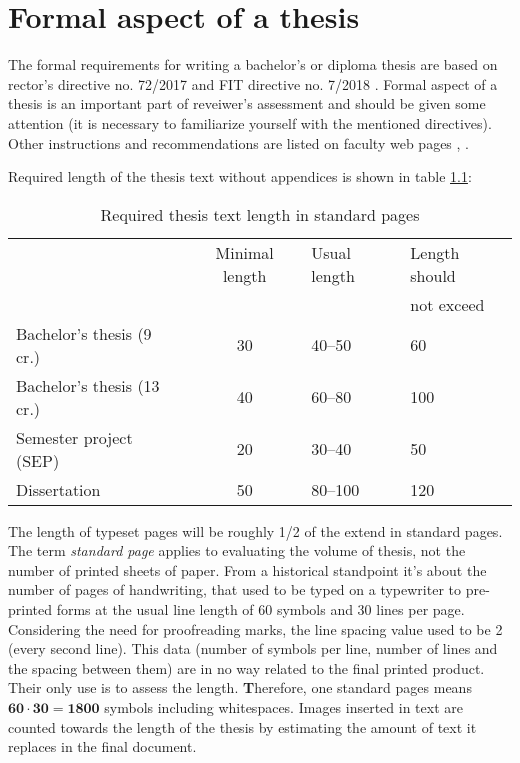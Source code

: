 {{\chapter{Formal aspect of a thesis}
\label{formality}

The formal requirements for writing a bachelor's or diploma thesis are based on rector's directive no. 72/2017 \cite{smernice} and FIT directive no. 7/2018 \cite{smerniceFIT}. Formal aspect of a thesis is an important part of reveiwer's  assessment and should be given some attention (it is necessary to familiarize yourself with the mentioned directives). Other instructions and recommendations are listed on faculty web pages \cite{formalniBP}, \cite{formalniDP}.

Required length of the thesis text without appendices is shown in table \ref{rozsah}:

\begin{table}[hbt]
\centering
\caption{Required thesis text length in standard pages}
\label{rozsah}
\begin{tabular}{|l|c|l|l|}
\hline
 & Minimal length & Usual length & Length should \\
 &  &  & not exceed  \\ \hline
Bachelor's thesis (9 cr.) & 30 & 40--50 & 60 \\ \hline
Bachelor's thesis (13 cr.) & 40 & 60--80 & 100 \\ \hline
Semester project (SEP) & 20 & 30--40 & 50 \\ \hline
Dissertation & 50 & 80--100 & 120 \\ \hline
\end{tabular}
\end{table}

The length of typeset pages will be roughly 1/2 of the extend in standard pages. The term {\it standard page} applies to evaluating the volume of thesis, not the number of printed sheets of paper. From a historical standpoint it's about the number of pages of handwriting, that used to be typed on a typewriter to pre-printed forms at the usual line length of 60 symbols and 30 lines per page. Considering the need for proofreading marks, the line spacing value used to be 2 (every second line). This data (number of symbols per line, number of lines and the spacing between them) are in no way related to the final printed product. Their only use is to assess the length. \textbf Therefore, one standard pages means $\mathbf{60\cdot 30 = 1800}$ symbols including whitespaces\rm. Images inserted in text are counted towards the length of the thesis by estimating the amount of text it replaces in the final document.

}}
